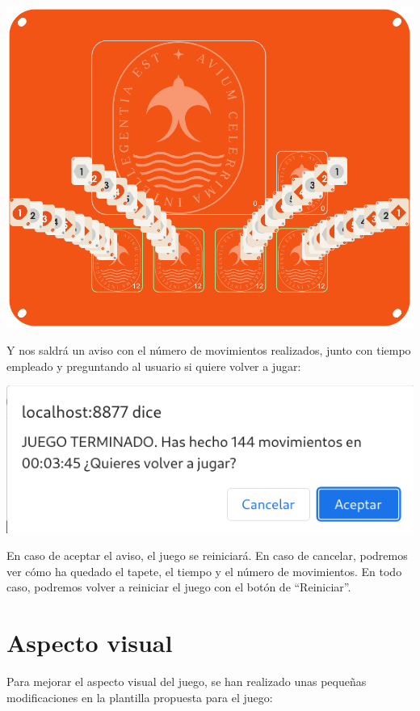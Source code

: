 \documentclass{\ClassPath/viu-tfm-template}
\begin{document}
\vspace{-1em}
\begin{center}
    \includegraphics[width=0.8\linewidth]{img/final.png}
\end{center}
\vspace{-1em}

Y nos saldrá un aviso con el número de movimientos realizados, junto con tiempo empleado y preguntando al usuario si quiere volver a jugar:

\vspace{-1em}
\begin{center}
    \includegraphics[frame,width=0.3\linewidth]{img/aviso.png}
\end{center}
\vspace{-1em}

En caso de aceptar el aviso, el juego se reiniciará. En caso de cancelar, podremos ver cómo ha quedado el tapete, el tiempo y el número de movimientos. En todo caso, podremos volver a reiniciar el juego con el botón de “Reiniciar”.

\chapter{Aspecto visual}
Para mejorar el aspecto visual del juego, se han realizado unas pequeñas modificaciones en la plantilla propuesta para el juego:
\end{document}

